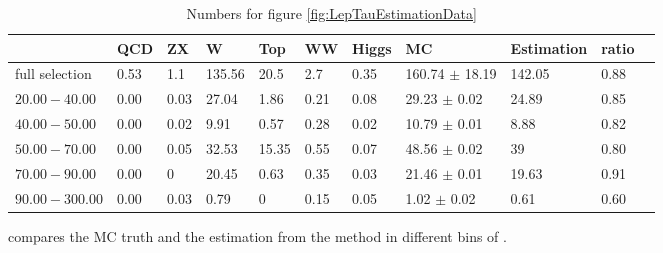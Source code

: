 \begin{table}
\begin{center}
\begin{tabular}{lllllllllll}
\hline
\hline
               &  QCD     &  ZX     &  W     & Top      & WW      & Higgs     & MC                 &  Estimation &ratio        &      \\             
\hline
\hline
full selection & 0.53     & 1.1     & 135.56 & 20.5     & 2.7     & 0.35       & 160.74 $\pm$ 18.19 & 142.05    &  0.88 \\
$20.00-40.00$  & 0.00     & 0.03    & 27.04  & 1.86     & 0.21    & 0.08       & 29.23 $\pm$ 0.02   & 24.89     &  0.85 \\
$40.00-50.00$  & 0.00     & 0.02    & 9.91   & 0.57     & 0.28    & 0.02       & 10.79 $\pm$ 0.01   & 8.88      &  0.82 \\
$50.00-70.00$  & 0.00     & 0.05    & 32.53  & 15.35    & 0.55    & 0.07       & 48.56 $\pm$ 0.02   & 39        &  0.80 \\
$70.00-90.00$  & 0.00     & 0       & 20.45  & 0.63     & 0.35    & 0.03       & 21.46 $\pm$ 0.01   & 19.63     &  0.91 \\
$90.00-300.00$ & 0.00     & 0.03    & 0.79   & 0        & 0.15    & 0.05       & 1.02 $\pm$ 0.02    & 0.61      &   0.60\\
\hline
\hline
\end{tabular}
\caption{Numbers for figure \ref{fig:LepTauEstimationData}}
\label{tbl:LepTauEstimationData}
\end{center}
\end{table}
compares the MC truth and the estimation from the method in different bins of \mttwo.
